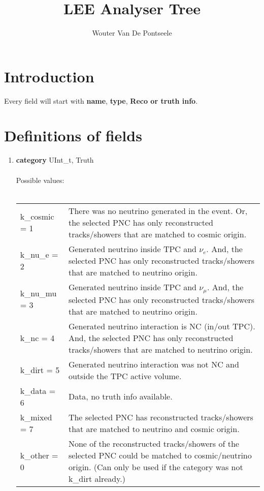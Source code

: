 \documentclass{article}
\begin{document}
\title{LEE Analyser Tree}
\author{Wouter Van De Pontseele}

\maketitle

\tableofcontents
\section*{Introduction}
Every field will start with \textbf{name}, \textbf{type}, \textbf{Reco or truth info}.
\clearpage

\section{Definitions of fields}
\begin{enumerate}


\item \textbf{category} \hfill UInt\_t, Truth \\ \\
Possible values: \\ \\
\begin{tabularx}{\linewidth}{lX}
k\_cosmic = 1 & There was no neutrino generated in the event. Or, the selected PNC has only reconstructed tracks/showers that are matched to cosmic origin.\\
k\_nu\_e = 2  & Generated neutrino inside TPC and $\nu_e$. And, the selected PNC has only  reconstructed tracks/showers that are matched to neutrino origin.\\
k\_nu\_mu = 3 & Generated neutrino inside TPC and $\nu_\mu$. And, the selected PNC has only  reconstructed tracks/showers that are matched to neutrino origin.\\
k\_nc = 4 & Generated neutrino interaction is NC (in/out TPC). And, the selected PNC has  only reconstructed tracks/showers that are matched to neutrino origin.\\
k\_dirt = 5 & Generated neutrino interaction was not NC and outside the TPC active volume. \\
k\_data = 6 & Data, no truth info available. \\
k\_mixed = 7 & The selected PNC has reconstructed tracks/showers that are matched to neutrino and cosmic origin. \\
k\_other = 0 & None of the reconstructed tracks/showers of the selected PNC could be matched to cosmic/neutrino origin. (Can only be used if the category was not k\_dirt already.)
\end{tabularx}
\vspace{5mm}



\end{enumerate}
\end{document}
